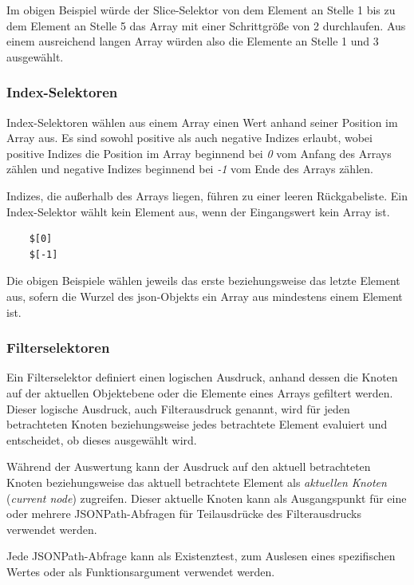 \documentclass[oneside]{ausarbeitung}
\begin{document}
Im obigen Beispiel würde der Slice-Selektor von dem Element an Stelle 1 bis zu dem Element an Stelle 5 das Array mit einer Schrittgröße von 2 durchlaufen. Aus einem ausreichend langen Array würden also die Elemente an Stelle 1 und 3 ausgewählt. 
	  
	
	
\subsubsection{Index-Selektoren}
	
Index-Selektoren wählen aus einem Array einen Wert anhand seiner Position im Array aus. Es sind sowohl positive als auch negative Indizes erlaubt, wobei positive Indizes die Position im Array beginnend bei \textit{0} vom Anfang des Arrays zählen und negative Indizes beginnend bei \textit{-1} vom Ende des Arrays zählen.
	
Indizes, die außerhalb des Arrays liegen, führen zu einer leeren Rückgabeliste. Ein Index-Selektor wählt kein Element aus, wenn der Eingangswert kein Array ist.
	
\begin{lstlisting}
	$[0]
	$[-1]
\end{lstlisting}
	
Die obigen Beispiele wählen jeweils das erste beziehungsweise das letzte Element aus, sofern die Wurzel des \ac{json}-Objekts ein Array aus mindestens einem Element ist. 
	
	
	
\subsubsection{Filterselektoren}
	
Ein Filterselektor definiert einen logischen Ausdruck, anhand dessen die Knoten auf der aktuellen Objektebene oder die Elemente eines Arrays gefiltert werden. Dieser logische Ausdruck, auch Filterausdruck genannt, wird für jeden betrachteten Knoten beziehungsweise jedes betrachtete Element evaluiert und entscheidet, ob dieses ausgewählt wird. 
	
Während der Auswertung kann der Ausdruck auf den aktuell betrachteten Knoten beziehungsweise das aktuell betrachtete Element als \textit{aktuellen Knoten} (\textit{current node}) zugreifen. Dieser aktuelle Knoten kann als Ausgangspunkt für eine oder mehrere JSONPath-Abfragen für Teilausdrücke des Filterausdrucks verwendet werden.
	
Jede JSONPath-Abfrage kann als Existenztest, zum Auslesen eines spezifischen Wertes oder als Funktionsargument verwendet werden.
	
\end{document}
